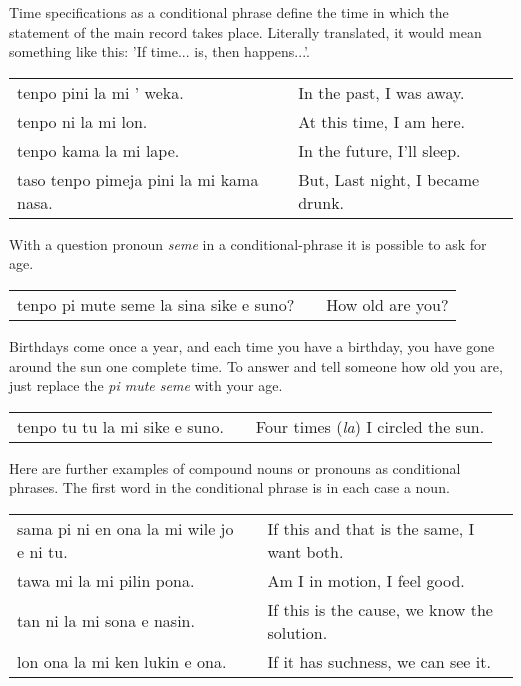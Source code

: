 Time specifications as a conditional phrase define the time in which the statement of the main record takes place. 
Literally translated, it would mean something like this: 'If time... is, then happens...'. 

\begin{supertabular}{p{5,5cm}|ll}
tenpo pini la mi ' weka. && In the past, I was away. \\
tenpo ni la mi lon. && At this time, I am here. \\
tenpo kama la mi lape. && In the future, I'll sleep. \\
taso tenpo pimeja pini la mi kama nasa. && But, Last night, I became drunk. \\
\end{supertabular} 


With a question pronoun \textit{seme} in a conditional-phrase it is possible to ask for age.

\begin{supertabular}{p{5,5cm}|ll}
tenpo pi mute seme la sina sike e suno? && How old are you? \\
\end{supertabular} 

Birthdays come once a year, and each time you have a birthday, you have gone around the sun one complete time. 
To answer and tell someone how old you are, just replace the \textit{pi mute seme} with your age.

\begin{supertabular}{p{5,5cm}|ll}
tenpo tu tu la mi sike e suno. && Four times (\textit{la}) I circled the sun. \\
\end{supertabular} 

Here are further examples of compound nouns or pronouns as conditional phrases. 
The first word in the conditional phrase is in each case a noun.

\begin{supertabular}{p{5,5cm}|ll}
sama pi ni en ona la mi wile jo e ni tu. &&  If this and that is the same, I want both.\\
tawa mi la mi pilin pona. && Am I in motion, I feel good. \\
tan ni la mi sona e nasin. && If this is the cause, we know the solution. \\
lon ona la mi ken lukin e ona. && If it has suchness, we can see it. \\
\end{supertabular} 

